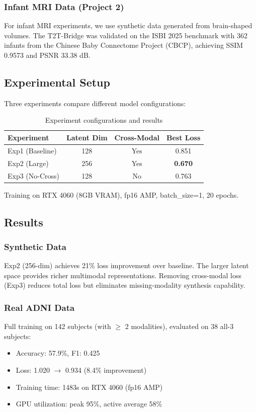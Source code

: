 \documentclass[11pt,a4paper]{article}
\begin{document}
\subsubsection{Infant MRI Data (Project 2)}
For infant MRI experiments, we use synthetic data generated from brain-shaped volumes. The T2T-Bridge was validated on the ISBI 2025 benchmark with 362 infants from the Chinese Baby Connectome Project (CBCP), achieving SSIM 0.9573 and PSNR 33.38 dB.

\subsection{Experimental Setup}
Three experiments compare different model configurations:

\begin{table}[H]
\centering
\caption{Experiment configurations and results}
\begin{tabular}{lccc}
\toprule
\textbf{Experiment} & \textbf{Latent Dim} & \textbf{Cross-Modal} & \textbf{Best Loss} \\
\midrule
Exp1 (Baseline) & 128 & Yes & 0.851 \\
Exp2 (Large) & 256 & Yes & \textbf{0.670} \\
Exp3 (No-Cross) & 128 & No & 0.763 \\
\bottomrule
\end{tabular}
\end{table}

Training on RTX 4060 (8GB VRAM), fp16 AMP, batch\_size=1, 20 epochs.

\subsection{Results}

\subsubsection{Synthetic Data}
Exp2 (256-dim) achieves 21\% loss improvement over baseline. The larger latent space provides richer multimodal representations. Removing cross-modal loss (Exp3) reduces total loss but eliminates missing-modality synthesis capability.

\subsubsection{Real ADNI Data}
Full training on 142 subjects (with $\geq$ 2 modalities), evaluated on 38 all-3 subjects:
\begin{itemize}
    \item Accuracy: 57.9\%, F1: 0.425
    \item Loss: 1.020 $\to$ 0.934 (8.4\% improvement)
    \item Training time: 1483s on RTX 4060 (fp16 AMP)
    \item GPU utilization: peak 95\%, active average 58\%
\end{itemize}
\end{document}
